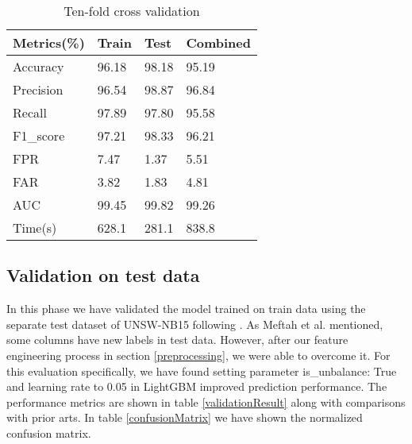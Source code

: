 \documentclass[14pt, conference]{IEEEtran}
\begin{document}
\begin{table}
\normalsize
\centering
\caption{Ten-fold cross validation}
\label{tenFoldCrossValidation}
\renewcommand{\arraystretch}{1.2}
\begin{tabular}{|C{2.3cm}|C{1.3cm}|C{1.3cm}|C{1.8cm}|}
\hline
\textbf{Metrics(\%)} & \textbf{Train} & \textbf{Test} & \textbf{Combined}\\ \hline
Accuracy & 96.18 & 98.18 & 95.19 \\ \hline
Precision & 96.54 & 98.87& 96.84\\ \hline
Recall  & 97.89 & 97.80 & 95.58\\ \hline
F1\_score  & 97.21 & 98.33 & 96.21\\ \hline
FPR & 7.47 & 1.37 & 5.51\\ \hline
FAR & 3.82 & 1.83 & 4.81 \\ \hline
AUC & 99.45 & 99.82 & 99.26\\ \hline
Time(s) & 628.1 & 281.1 & 838.8\\ \hline
\end{tabular}
\end{table}


\subsection{Validation on test data \label{validationResultsOnTest}}
In this phase we have validated the model trained on train data using the separate test dataset of UNSW-NB15 following
\cite{moustafa2016evaluation} \cite{bhamare2016feasibility} \cite{vinayakumar2019deep} \cite{dahiya2018network}. As  Meftah et al. \cite{meftah2019network}
mentioned, some columns have new labels in test data. However, after our feature engineering process in section
\ref{preprocessing}, we were able to overcome it. For this evaluation specifically, we have found setting parameter
is\_unbalance: True and learning rate to 0.05 in LightGBM improved prediction performance. The performance metrics
are shown in table \ref{validationResult} along with comparisons with prior arts. In table \ref{confusionMatrix}
we have shown the normalized confusion matrix.
\end{document}
